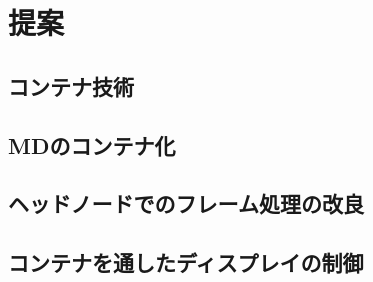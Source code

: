 \chapter{提案}


\section{コンテナ技術}

\section{MDのコンテナ化}

\section{ヘッドノードでのフレーム処理の改良}

\section{コンテナを通したディスプレイの制御}